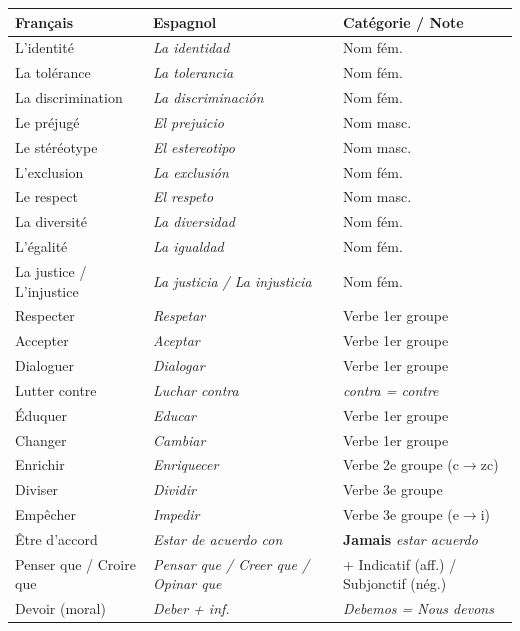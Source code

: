 \documentclass[11pt]{article}
\newcommand{\esp}[1]{\ifmmode\text{\textit{#1}}\else\begingroup\selectlanguage{spanish}\itshape #1\endgroup\fi}
\begin{document}
\begin{propriete}
\begin{center}
\begin{tabularx}{\linewidth}{|X|X|X|}
\hline
\rowcolor{popblueL} \textbf{Français} & \textbf{Espagnol} & \textbf{Catégorie / Note} \\ \hline
L'identité & \esp{La identidad} & Nom fém. \\ \hline
La tolérance & \esp{La tolerancia} & Nom fém. \\ \hline
La discrimination & \esp{La discriminación} & Nom fém. \\ \hline
Le préjugé & \esp{El prejuicio} & Nom masc. \\ \hline
Le stéréotype & \esp{El estereotipo} & Nom masc. \\ \hline
L'exclusion & \esp{La exclusión} & Nom fém. \\ \hline
Le respect & \esp{El respeto} & Nom masc. \\ \hline
La diversité & \esp{La diversidad} & Nom fém. \\ \hline
L'égalité & \esp{La igualdad} & Nom fém. \\ \hline
La justice / L'injustice & \esp{La justicia / La injusticia} & Nom fém. \\ \hline
Respecter & \esp{Respetar} & Verbe 1er groupe \\ \hline
Accepter & \esp{Aceptar} & Verbe 1er groupe \\ \hline
Dialoguer & \esp{Dialogar} & Verbe 1er groupe \\ \hline
Lutter contre & \esp{Luchar contra} & \esp{contra} = contre \\ \hline
Éduquer & \esp{Educar} & Verbe 1er groupe \\ \hline
Changer & \esp{Cambiar} & Verbe 1er groupe \\ \hline
Enrichir & \esp{Enriquecer} & Verbe 2e groupe (c$\rightarrow$zc) \\ \hline
Diviser & \esp{Dividir} & Verbe 3e groupe \\ \hline
Empêcher & \esp{Impedir} & Verbe 3e groupe (e$\rightarrow$i) \\ \hline
Être d'accord & \esp{Estar de acuerdo con} & \textbf{Jamais} \esp{*estar acuerdo} \\ \hline
Penser que / Croire que & \esp{Pensar que / Creer que / Opinar que} & + Indicatif (aff.) / Subjonctif (nég.) \\ \hline
Devoir (moral) & \esp{Deber} + inf. & \esp{Debemos} = Nous devons \\ \hline

\end{tabularx}
\end{center}
\end{propriete}
\end{document}
